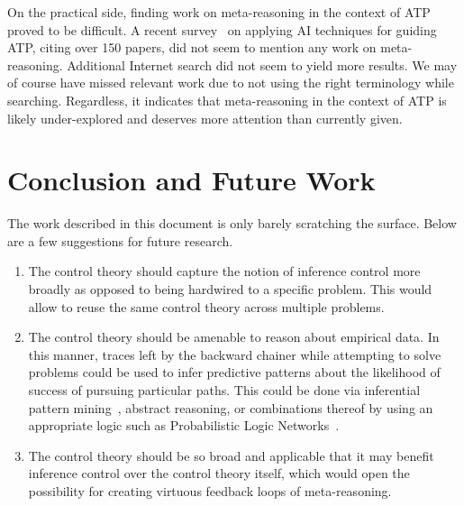 \documentclass{easychair}
\begin{document}
On the practical side, finding work on meta-reasoning in the context
of ATP proved to be difficult.  A recent
survey~\cite{Blaauwbroek2024LearningGA} on applying AI techniques for
guiding ATP, citing over 150 papers, did not seem to mention any work
on meta-reasoning.  Additional Internet search did not seem to yield
more results.  We may of course have missed relevant work due to not
using the right terminology while searching.  Regardless, it indicates
that meta-reasoning in the context of ATP is likely under-explored and
deserves more attention than currently given.

\section{Conclusion and Future Work}

The work described in this document is only barely scratching the
surface.  Below are a few suggestions for future research.
\begin{enumerate}
\item The control theory should capture the notion of inference
  control more broadly as opposed to being hardwired to a specific
  problem.  This would allow to reuse the same control theory across
  multiple problems.
\item The control theory should be amenable to reason about empirical
  data.  In this manner, traces left by the backward chainer while
  attempting to solve problems could be used to infer predictive
  patterns about the likelihood of success of pursuing particular
  paths.  This could be done via inferential pattern
  mining~\cite{Geisweiller2019}, abstract reasoning, or combinations
  thereof by using an appropriate logic such as Probabilistic Logic
  Networks~\cite{Goertzel09PLN}.
\item The control theory should be so broad and applicable that it may
  benefit inference control over the control theory itself, which
  would open the possibility for creating virtuous feedback loops of
  meta-reasoning.
\end{enumerate}
\end{document}
